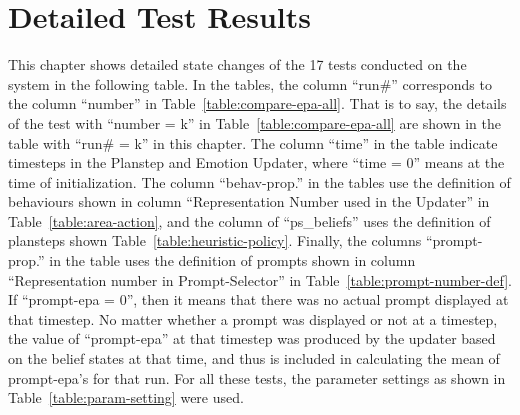 \chapter{Detailed Test Results}

This chapter shows detailed state changes of the 17 tests conducted on the system in the following table. In the tables, the column ``run\#'' corresponds to the column ``number'' in Table~\ref{table:compare-epa-all}. That is to say, the details of the test with ``number = k'' in Table~\ref{table:compare-epa-all} are shown in the table with ``run\# = k'' in this chapter. The column ``time'' in the table indicate timesteps in the Planstep and Emotion Updater, where ``time = 0'' means at the time of initialization. The column ``behav-prop.'' in the tables use the definition of behaviours shown in column ``Representation Number used in the Updater'' in Table~\ref{table:area-action}, and the column of ``ps\_beliefs'' uses the definition of plansteps shown Table~\ref{table:heuristic-policy}. Finally, the columns ``prompt-prop.'' in the table uses the definition of prompts shown in column ``Representation number in Prompt-Selector'' in Table~\ref{table:prompt-number-def}. If ``prompt-epa = 0'', then it means that there was no actual prompt displayed at that timestep. No matter whether a prompt was displayed or not at a timestep, the value of ``prompt-epa'' at that timestep was produced by the updater based on the belief states at that time, and thus is included in calculating the mean of prompt-epa's for that run. For all these tests, the parameter settings as shown in Table~\ref{table:param-setting} were used.

